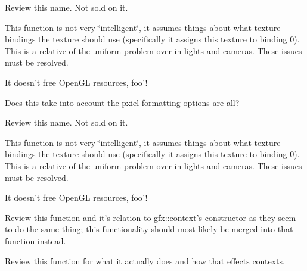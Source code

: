 \begin{DoxyRefList}
\item[\label{todo__todo000028}%
\hypertarget{todo__todo000028}{}%
Member \hyperlink{classgfx_1_1texture__1D_a74147fa5a5b6a8a849936fe34bacf9d0}{gfx\-:\-:texture\-\_\-1\-D\-:\-:pixels} () const ]Review this name. Not sold on it.  
\item[\label{todo__todo000030}%
\hypertarget{todo__todo000030}{}%
Member \hyperlink{classgfx_1_1texture__1D_ab137e982a9faaa001b7ac7d1c087a1ce}{gfx\-:\-:texture\-\_\-1\-D\-:\-:use} ()]This function is not very \char`\"{}intelligent\char`\"{}, it assumes things about what texture bindings the texture should use (specifically it assigns this texture to binding 0). This is a relative of the uniform problem over in lights and cameras. These issues must be resolved.  
\item[\label{todo__todo000027}%
\hypertarget{todo__todo000027}{}%
Member \hyperlink{classgfx_1_1texture__1D_a20e9b9e4ff10e2ce94c457dd3de14984}{gfx\-:\-:texture\-\_\-1\-D\-:\-:$\sim$texture\-\_\-1\-D} ()]It doesn't free Open\-G\-L resources, foo'!  
\item[\label{todo__todo000033}%
\hypertarget{todo__todo000033}{}%
Member \hyperlink{classgfx_1_1texture__2D_ace41d30890b6fa0526b1e3a1b8c5f257}{gfx\-:\-:texture\-\_\-2\-D\-:\-:load\-\_\-data} ()]Does this take into account the pxiel formatting options are all?  
\item[\label{todo__todo000032}%
\hypertarget{todo__todo000032}{}%
Member \hyperlink{classgfx_1_1texture__2D_aaaa730b58b577b595d2bf09825084229}{gfx\-:\-:texture\-\_\-2\-D\-:\-:pixels} () const ]Review this name. Not sold on it.  
\item[\label{todo__todo000034}%
\hypertarget{todo__todo000034}{}%
Member \hyperlink{classgfx_1_1texture__2D_ae65a78bcf166c199034d00e3c2b4fcea}{gfx\-:\-:texture\-\_\-2\-D\-:\-:use} ()]This function is not very \char`\"{}intelligent\char`\"{}, it assumes things about what texture bindings the texture should use (specifically it assigns this texture to binding 0). This is a relative of the uniform problem over in lights and cameras. These issues must be resolved.  
\item[\label{todo__todo000031}%
\hypertarget{todo__todo000031}{}%
Member \hyperlink{classgfx_1_1texture__2D_a276827f3418a15f5d8e9cc858f770dd5}{gfx\-:\-:texture\-\_\-2\-D\-:\-:$\sim$texture\-\_\-2\-D} ()]It doesn't free Open\-G\-L resources, foo'!  
\item[\label{todo__todo000007}%
\hypertarget{todo__todo000007}{}%
Member \hyperlink{classgfx_1_1video__system_ac7264db27125bc83be5b5c8a24dfbd2d}{gfx\-:\-:video\-\_\-system\-:\-:attach\-\_\-context} (window const \&window, context \&context)]Review this function and it's relation to \hyperlink{classgfx_1_1context_a7994d7183d5febf0b66f8e574d172180}{gfx\-:\-:context's constructor} as they seem to do the same thing; this functionality should most likely be merged into that function instead. 
\item[\label{todo__todo000008}%
\hypertarget{todo__todo000008}{}%
Member \hyperlink{classgfx_1_1window_1_1settings__3D_a993d9801b5cd6d911cab12c42093f103}{gfx\-:\-:window\-:\-:settings\-\_\-3\-D\-:\-:framebuffer\-\_\-bits} (unsigned int b)]Review this function for what it actually does and how that effects contexts. 
\end{DoxyRefList}